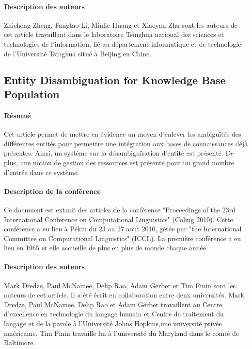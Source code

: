 \documentclass{article}
\begin{document}
\paragraph{Description des auteurs}
Zhicheng Zheng, Fangtao Li, Minlie Huang et Xiaoyan Zhu sont les auteurs de cet article travaillant dans le laboratoire Tsinghua national des sciences et technologies de l’information, lié au département informatique et de technologie de l'Université Tsinghua situé à Beijing en Chine.



\subsection{Entity Disambiguation for Knowledge Base Population\cite{article-5}}

\paragraph{Résumé}

Cet article permet de mettre en évidence un moyen d'enlever les ambiguïtés des différentes entités pour permettre une intégration aux bases de connaissances déjà présentes. Ainsi, un système sur la désambiguïsation d'entité est présenté. De plus, une notion de gestion des ressources est présente pour un grand nombre d'entrée dans ce système.

\paragraph{Description de la conférence} 
Ce document est extrait des articles de la conférence "Proceedings of the 23rd International Conference on Computational Linguistics" (Coling 2010). Cette conférence a eu lieu à Pékin du 23 au 27 aout 2010, gérée par "the International Committee on Computational Linguistics" (ICCL). La première conférence a eu lieu en 1965 et elle accueille de plus en plus de monde chaque année.

\paragraph{Description des auteurs}
Mark Dredze, Paul McNamee, Delip Rao, Adam Gerber et Tim Finin sont les auteurs de cet article. Il a été écrit en collaboration entre deux universités.
Mark Dredze, Paul McNamee, Delip Rao et Adam Gerber travaillent au Centre d'excellence en technologie du langage humain et Centre de traitement du langage et de la parole à l'Université Johns Hopkins,une université privée américaine.
Tim Finin travaille lui à l'université du Maryland dans le comté de Baltimore.
\end{document}
